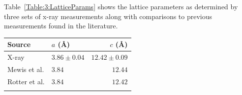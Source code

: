 Table~\ref{Table:3:LatticeParams} shows the lattice parameters as determined by three sets of x-ray measurements along with comparisons to previous measurements found in the literature.
\medskip
\begin{center}
    \begin{tabular}[h!]{llr}
\toprule
Source  &  $a$ (\AA) & $c$ (\AA) \\
\midrule
X-ray   & $3.86\pm0.04$  & $12.42\pm0.09$ \\
Mewis et al.\cite{Mewis1980} & $3.84$ & $12.44$ \\
Rotter et al.\cite{Rotter2010} & $3.84$ & $12.42$ \\
\bottomrule
    \label{Table:3:LatticeParams}
    \end{tabular}
\end{center}

